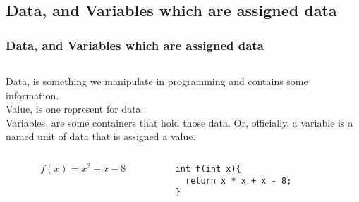 \documentclass[en, 11pt, xcolor=dvipsnames]{beamer}
\begin{document}
\subsection{Data, and Variables which are assigned data}
\begin{frame}[fragile]
	\frametitle{Data, and Variables which are assigned data}


	\begin{columns}[c]
		\begin{column}{0.9\textwidth}

			{\scriptsize
				{
					Data, is something we manipulate in programming and contains some information.\\

					Value, is one represent for data.\\

					Variables, are some containers that hold those data.
					Or, officially, a variable is a named unit of data that is assigned a value.
				}
			}

			\begin{columns}[c]
				\begin{column}{0.5\textwidth}
					{\large
						\[
							f(x) = x^2 + x - 8
						\]
					}
				\end{column}
				\begin{column}{0.5\textwidth}
					\begin{lstlisting}[style=Java]
int f(int x){
  return x * x + x - 8;
}\end{lstlisting}


\end{column}
\end{columns}
\end{column}
\end{columns}
\end{frame}
\end{document}
